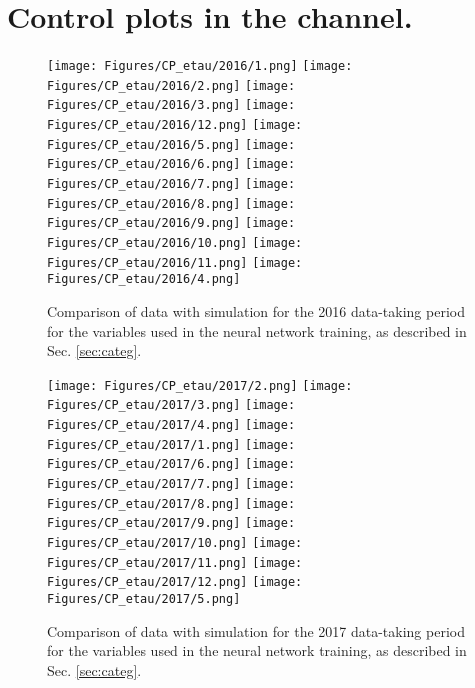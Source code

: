 \newpage
\section{Control plots in the \et channel.}\label{app:control-plots}
\begin{figure}[H]
    \centering
    \texttt{[image: Figures/CP\_etau/2016/1.png]}
    \texttt{[image: Figures/CP\_etau/2016/2.png]}
    \texttt{[image: Figures/CP\_etau/2016/3.png]}
    \texttt{[image: Figures/CP\_etau/2016/12.png]}
    \texttt{[image: Figures/CP\_etau/2016/5.png]}
    \texttt{[image: Figures/CP\_etau/2016/6.png]}
    \texttt{[image: Figures/CP\_etau/2016/7.png]}
    \texttt{[image: Figures/CP\_etau/2016/8.png]}
    \texttt{[image: Figures/CP\_etau/2016/9.png]}
    \texttt{[image: Figures/CP\_etau/2016/10.png]}
    \texttt{[image: Figures/CP\_etau/2016/11.png]}
    \texttt{[image: Figures/CP\_etau/2016/4.png]}
    \caption{Comparison of data with simulation for the 2016 data-taking period for the variables used in the neural network training, as described in Sec. \ref{sec:categ}.}
\end{figure}

\begin{figure}[H]
    \centering
    \texttt{[image: Figures/CP\_etau/2017/2.png]}
    \texttt{[image: Figures/CP\_etau/2017/3.png]}
    \texttt{[image: Figures/CP\_etau/2017/4.png]}
    \texttt{[image: Figures/CP\_etau/2017/1.png]}
    \texttt{[image: Figures/CP\_etau/2017/6.png]}
    \texttt{[image: Figures/CP\_etau/2017/7.png]}
    \texttt{[image: Figures/CP\_etau/2017/8.png]}
    \texttt{[image: Figures/CP\_etau/2017/9.png]}
    \texttt{[image: Figures/CP\_etau/2017/10.png]}
    \texttt{[image: Figures/CP\_etau/2017/11.png]}
    \texttt{[image: Figures/CP\_etau/2017/12.png]}
    \texttt{[image: Figures/CP\_etau/2017/5.png]}
    \caption{Comparison of data with simulation for the 2017 data-taking period for the variables used in the neural network training, as described in Sec. \ref{sec:categ}.}
\end{figure}

